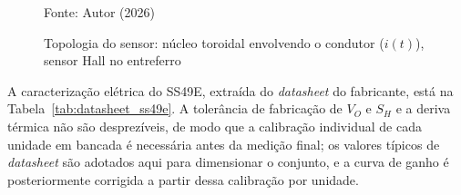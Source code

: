 \begin{figure}[H]
\centering
\caption{Topologia do sensor: núcleo toroidal envolvendo o condutor
($i(t)$), sensor Hall no entreferro}
\label{fig:topologia_sensor_corrente}

Fonte: Autor (2026)
\end{figure}

A caracterização elétrica do SS49E, extraída do \textit{datasheet} do
fabricante, está na Tabela~\ref{tab:datasheet_ss49e}. A tolerância de
fabricação de $V_O$ e $S_H$ e a deriva térmica não são desprezíveis, de
modo que a calibração individual de cada unidade em bancada é necessária
antes da medição final; os valores típicos de \textit{datasheet} são
adotados aqui para dimensionar o conjunto, e a curva de ganho é
posteriormente corrigida a partir dessa calibração por unidade.

